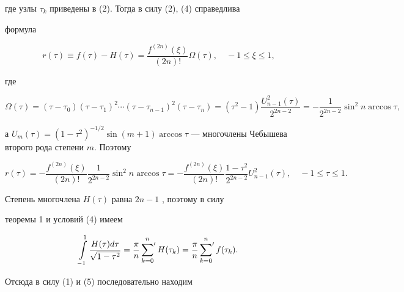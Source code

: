 где узлы $\tau_{k}$ приведены в (2). Тогда в силу (2), (4) справедлива


формула


$$


r( \tau) \equiv f( \tau) - H( \tau) = \frac{f^{(2n)}( \xi)}{(2n)!}


\Omega( \tau), \quad -1 \leq \xi \leq 1,


$$


где


$$


\Omega( \tau) = ( \tau - \tau_0) ( \tau- \tau_1)^2 \dotsb ( \tau -


\tau_{n-1})^2 ( \tau - \tau_n)=


( \tau^2-1) \frac{ U_{n-1}^2 ( \tau)} {2^{2n-2}} = - \frac{1}


{2^{2n-2}} \sin^2 n \arccos \tau,


$$


а $U_m ( \tau) = (1- \tau^2)^{-1/2} \sin (m+1)


\arccos \tau$ --- многочлены Чебышева второго рода степени $m$. Поэтому


\begin{equation}


r( \tau)= - \frac{f^{(2n)}( \xi)}{(2n)!} \frac{1}{2^{2n-2} } 


\sin^2 n \arccos \tau =


- \frac{f^{(2n)} ( \xi)} {(2n)!} \frac{1- \tau^2} {2^{2n-2}}


U_{n-1}^2 ( \tau), \quad -1 \leq \tau \leq 1.


\end{equation}





Степень многочлена $ H( \tau) $ равна $ 2n-1 $ , поэтому в силу


теоремы 1 и условий (4) имеем


$$


\int \limits_{-1}^1 \frac{H( \tau) d \tau} { \sqrt{1- \tau^2}} =


\frac{ \pi}{n} \sideset{}{'}\sum_{k=0}^n H( \tau_k) =


\frac{ \pi}{n} \sideset{}{'}\sum_{k=0}


^n f( \tau_k).


$$


Отсюда в силу (1) и (5) последовательно находим


